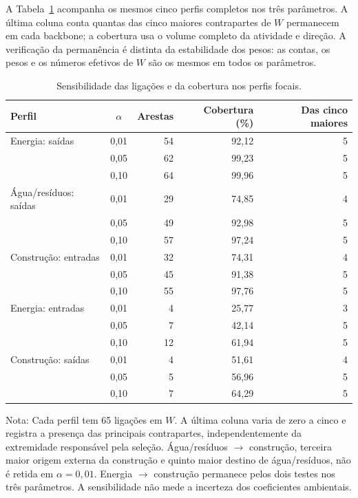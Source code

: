 A Tabela~\ref{tab:sensibilidade-casos} acompanha os mesmos cinco perfis completos nos três parâmetros. A última coluna conta quantas das cinco maiores contrapartes de $W$ permanecem em cada backbone; a cobertura usa o volume completo da atividade e direção. A verificação da permanência é distinta da estabilidade dos pesos: as contas, os pesos e os números efetivos de $W$ são os mesmos em todos os parâmetros.

\begin{table}[htbp]
\centering
\caption{Sensibilidade das ligações e da cobertura nos perfis focais.}
\label{tab:sensibilidade-casos}
\small
\begin{tabular}{@{}lcrrr@{}}
\toprule
Perfil & $\alpha$ & Arestas & Cobertura (\%) & Das cinco maiores \\
\midrule
Energia: saídas & 0,01 & 54 & 92,12 & 5 \\
 & 0,05 & 62 & 99,23 & 5 \\
 & 0,10 & 64 & 99,96 & 5 \\
\addlinespace
Água/resíduos: saídas & 0,01 & 29 & 74,85 & 4 \\
 & 0,05 & 49 & 92,98 & 5 \\
 & 0,10 & 57 & 97,24 & 5 \\
\addlinespace
Construção: entradas & 0,01 & 32 & 74,31 & 4 \\
 & 0,05 & 45 & 91,38 & 5 \\
 & 0,10 & 55 & 97,76 & 5 \\
\addlinespace
Energia: entradas & 0,01 & 4 & 25,77 & 3 \\
 & 0,05 & 7 & 42,14 & 5 \\
 & 0,10 & 12 & 61,94 & 5 \\
\addlinespace
Construção: saídas & 0,01 & 4 & 51,61 & 4 \\
 & 0,05 & 5 & 56,96 & 5 \\
 & 0,10 & 7 & 64,29 & 5 \\
\bottomrule
\end{tabular}
\begin{notas}
Nota: Cada perfil tem 65 ligações em $W$. A última coluna varia de zero a cinco e registra a presença das principais contrapartes, independentemente da extremidade responsável pela seleção. Água/resíduos $\rightarrow$ construção, terceira maior origem externa da construção e quinto maior destino de água/resíduos, não é retida em $\alpha=0{,}01$. Energia $\rightarrow$ construção permanece pelos dois testes nos três parâmetros. A sensibilidade não mede a incerteza dos coeficientes ambientais.
\end{notas}
\end{table}
